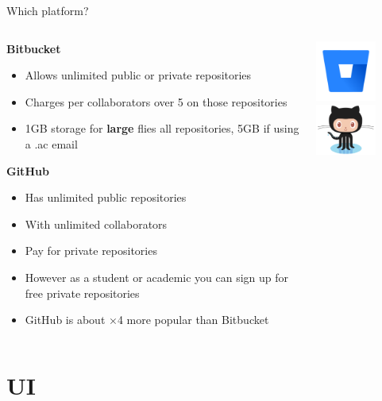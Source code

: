\documentclass[10pt]{beamer}
\begin{document}
{\begin{frame}[fragile]{Which platform?}
\begin{columns}[T]
\begin{column}{.8\textwidth}
\textbf{Bitbucket}
\begin{itemize}
\item Allows unlimited public or private repositories
\item Charges per collaborators over 5 on those repositories 
\item 1GB storage for \textbf{large} flies all repositories, 5GB if using a .ac email
\end{itemize}
\textbf{GitHub}
\begin{itemize}
\item Has unlimited public repositories 
\item With unlimited collaborators
\item Pay for private repositories
\item However as a student or academic you can sign up for free private repositories
\item GitHub is about $\times$4 more popular than Bitbucket
\end{itemize}
\end{column}
\begin{column}{.2\textwidth}
\includegraphics[width=2cm]{Figs/git/Bitbucket} \newline \newline \newline \newline 
\includegraphics[width=2cm]{Figs/git/Octocat}
\end{column}
\end{columns}
\end{frame}



\section{UI}


}
\end{document}
